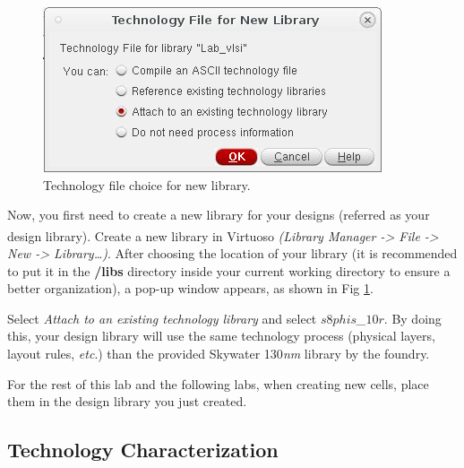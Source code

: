 \begin{enumerate}
	\parbox[t]{\dimexpr\textwidth-\leftmargin}{%
		\begin{figure}
			\vspace{0mm}
			\centering
			\vspace{-\baselineskip}
			\includegraphics[scale=0.6]{figures/lab1_schematic_sim/lib}
			\caption{Technology file choice for new library.}
			\label{fig_lib}
		\end{figure}
		\item Now, you first need to create a new library for your designs (referred as your design library). Create a new library in Virtuoso\textsuperscript{\tiny\textregistered} \textit{(Library Manager -> File -> New -> Library…)}. After choosing the location of your library (it is recommended to put it in the \textbf{/libs} directory inside your current working directory to ensure a better organization), a pop-up window appears, as shown in Fig \ref{fig_lib}. 
		\item Select \textit{Attach to an existing technology library} and select \textit{$s8phis$\_$10r$}. By doing this, your design library will use the same technology process (physical layers, layout rules, \textit{etc}.) than the provided Skywater 130\emph{nm} library by the foundry. \newline } 
	
	
	
	
	\item For the rest of this lab and the following labs, when creating new cells, place them in the design library you just created.
\end{enumerate}
\subsection{Technology Characterization}
